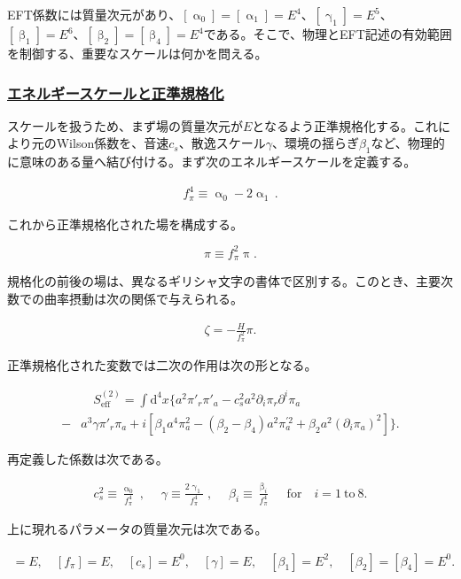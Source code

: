 \documentclass[a4paper,11pt]{ltjsarticle}
\numberwithin{equation}{section}
\newcommand{\subsubsectionlink}[1]{\subsubsection[#1]{\hyperlink{toc}{#1}}}
\def\pia{\pi_{a}}
\def\pir{\pi_{r}}
\newcommand{\dd}{\mathrm{d}}
\begin{document}
EFT係数には質量次元があり、$[\upalpha_0]=[\upalpha_1]=E^4$、$[\upgamma_1]=E^5$、$[\upbeta_1]=E^6$、$[\upbeta_2]=[\upbeta_4]=E^4$である。そこで、物理とEFT記述の有効範囲を制御する、重要なスケールは何かを問える。

\subsubsectionlink{エネルギースケールと正準規格化}

スケールを扱うため、まず場の質量次元が$E$となるよう正準規格化する。これにより元のWilson係数を、音速$c_s$、散逸スケール$\gamma$、環境の揺らぎ$\beta_1$など、物理的に意味のある量へ結び付ける。まず次のエネルギースケールを定義する。

\begin{align}
f_\pi^4 \equiv \upalpha_0 -2 \upalpha_1\,.
\end{align}

これから正準規格化された場を構成する。

\begin{equation}\label{eq:can}
\pi \equiv f_\pi^2 \uppi.
\end{equation}

規格化の前後の場は、異なるギリシャ文字の書体で区別する。このとき、主要次数での曲率摂動は次の関係で与えられる。

\begin{align}\label{eq:zetarel}
\zeta =  - \frac{H}{f_\pi^2} \pi.
\end{align}

正準規格化された変数では二次の作用は次の形となる。

\begin{align}\label{eq:canonorm} 
&\quad S_{\mathrm{eff}}^{(2)} = \int \dd^4 x \Big\{ a^2 \pi'_{r} \pi'_{a} - c_{s}^{2} a^2 \partial_i \pir  \partial^i \pia  \\
-&  a^3 \gamma \pi'_{r} \pia + i \left[\beta_{1} a^4 \pia^2 - \left(\beta_2 - \beta_4\right) a^2\pia^{\prime 2} + \beta_2 a^2 \left(\partial_i \pia \right)^2\right] \Big\}. \nonumber
\end{align}

再定義した係数は次である。

\begin{align}
c_s^{2} \equiv \frac{\upalpha_{0}}{f_\pi^4}\;,\quad\; \gamma \equiv
\frac{2\upgamma_{1}}{f_\pi^4}\;,\quad\;\beta_{i} \equiv \frac{\upbeta_{i}}{f_{\pi}^{4}}\;\quad\mathrm{for}\quad i = 1 ~\mathrm{to}~8.
\end{align}

上に現れるパラメータの質量次元は次である。

\begin{align}
[\pi] = E, \quad [f_\pi] = E, \quad [c_s] = E^0, \quad [\gamma] = E, \quad [\beta_1] = E^2, \quad [\beta_2] = [\beta_4] = E^0.
\end{align}
\end{document}

